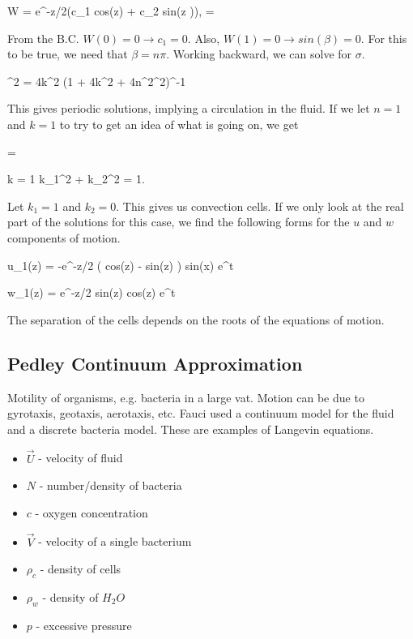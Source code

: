 \documentclass[]{article}
\numberwithin{equation}{section}		%
\let\[\equation
\let\]\endequation
\begin{document}
\[
W = e^{-z/2}(c_1 cos(\beta z) + c_2 sin(\beta z )),	\quad\quad \beta = 
\]

From the B.C. $W(0) = 0 \rightarrow c_1 = 0$. Also, $W(1) = 0 \rightarrow sin(\beta) = 0$. For this to be true, we need that
$\beta = n\pi$. Working backward, we can solve for $\sigma$.

\[
\sigma^2 = 4k^2 (1 + 4k^2 + 4n^2\pi^2)^{-1}
\]

This gives periodic solutions, implying a circulation in the fluid.  If we let $n=1$ and $k = 1$ to try to get an
idea of what is going on, we get

\[
\pi =  
\]

\[
k = 1 \quad \rightarrow \quad k_1^2 + k_2^2 = 1.
\]

Let $k_1 = 1$ and $k_2 = 0$. This gives us convection cells.  If we only look at the real part of the solutions for this
case, we find the following forms for the $u$ and $w$ components of motion.

\[
	u_1(z) = -e^{-z/2} \left( \pi cos(\pi z) -  sin(\pi z) \right) sin(x) e^{\sigma t}
\]

\[
	w_1(z) = e^{-z/2} sin(\pi z) cos(z) e^{\sigma t}
\]

The separation of the cells depends on the roots of the equations of motion.

\subsection{Pedley Continuum Approximation}
Motility of organisms, e.g. bacteria in a large vat.  Motion can be due to gyrotaxis, geotaxis, aerotaxis, etc.  Fauci used
a continuum model for the fluid and a discrete bacteria model. These are examples of Langevin equations.

\begin{itemize}
	\item $\vec{U}$ - velocity of fluid
	\item $N$ - number/density of bacteria
	\item $c$ - oxygen concentration
	\item $\vec{V}$ - velocity of a single bacterium
	\item $\rho_c$ - density of cells
	\item $\rho_w$ - density of $H_2 O$
	\item $p$ - excessive pressure
	
\end{itemize}
\end{document}
